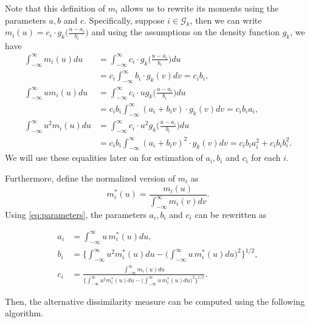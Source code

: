\documentclass[a4paper,12pt]{article}
\numberwithin{equation}{section}
\begin{document}
\begin{remark}
Note that this definition of $m_i$ allows us to rewrite its moments using the parameters $a, b$ and $c$. Specifically, suppose $i \in \mathcal{G}_k$, then we can write $m_i(u) = c_i \cdot g_k\Big(\frac{u - a_i}{b_i}\Big)$ and using the assumptions on the density function $g_k$, we have
\begin{align}\label{eq:parameters}
\int_{-\infty}^\infty m_i(u) du &= \int_{-\infty}^\infty c_i \cdot g_k\Big(\frac{u - a_i}{b_i}\Big) du \nonumber\\
&= c_i \int_{-\infty}^\infty b_i \cdot g_k(v) dv = c_i b_i, \nonumber\\
\int_{-\infty}^\infty u m_i(u) du &= \int_{-\infty}^\infty c_i \cdot u g_k\Big(\frac{u - a_i}{b_i}\Big) du \nonumber\\
&= c_i b_i \int_{-\infty}^\infty (a_i + b_i v) \cdot g_k(v) dv = c_i b_i a_i, \\
\int_{-\infty}^\infty u^2 m_i(u) du &= \int_{-\infty}^\infty c_i \cdot u^2 g_k\Big(\frac{u - a_i}{b_i}\Big) du \nonumber\\
&= c_i b_i \int_{-\infty}^\infty (a_i + b_i v)^2 \cdot g_k(v) dv = c_i b_i a_i^2+ c_i b_i b_i^2.\nonumber
\end{align}
We will use these equalities later on for estimation of $a_i, b_i$ and $c_i$ for each $i$.
\end{remark}

Furthermore, define the normalized version of $m_i$ as $$m_i^*(u) = \frac{m_i(u)}{\int_{-\infty}^\infty m_i(v)dv}.$$ Using \eqref{eq:parameters}, the parameters $a_i, b_i$ and $c_i$ can be rewritten as

\begin{align*}
a_i &= \int_{-\infty}^\infty u \, m_i^*(u) du, \\
b_i &= \bigg\{ \int_{-\infty}^\infty u^2 m_i^*(u) du  - \Big(\int_{-\infty}^\infty u\, m_i^*(u) du \Big)^2 \bigg\}^{1/2}, \\
c_i & = \frac{\int_{-\infty}^\infty m_i(u) du}{\Big\{ \int_{-\infty}^\infty u^2 m_i^*(u) du  - \Big(\int_{-\infty}^\infty u \,m_i^*(u) du \Big)^2 \Big\}^{1/2}}.
\end{align*}

Then, the alternative dissimilarity measure can be computed using the following algorithm.
\end{document}

